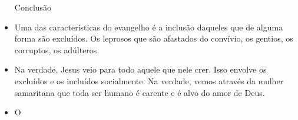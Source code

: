 \documentclass[12pt, legalpaper]{article}
\begin{document}
\begin{itemize}
   \begin{large}Conclusão\end{large}

   \item Uma das características do evangelho é a inclusão daqueles que de alguma forma são excluídos. 
   Os leprosos que são afastados do convívio, os gentios, os corruptos, os adúlteros. 

   \item Na verdade, Jesus veio para todo aquele que nele crer. Isso envolve os excluídos e os incluídos socialmente. Na verdade, vemos através da mulher samaritana que toda ser humano é carente e é alvo do amor de Deus.

   \item O

\end{itemize}
\end{document}
